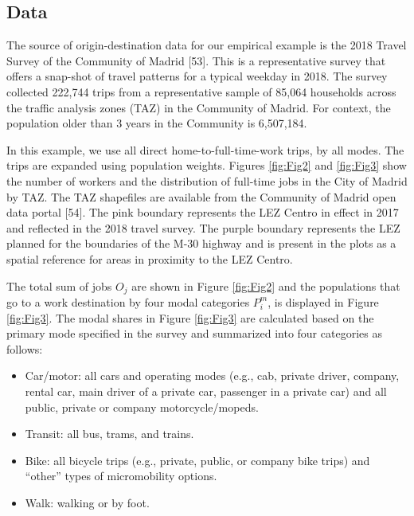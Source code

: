 \documentclass[10pt,letterpaper]{article}
\providecommand{\tightlist}{%
  \setlength{\itemsep}{0pt}\setlength{\parskip}{0pt}}
\begin{document}
\hypertarget{data}{%
\subsection{Data}\label{data}}

The source of origin-destination data for our empirical example is the
2018 Travel Survey of the Community of Madrid {[}53{]}. This is a
representative survey that offers a snap-shot of travel patterns for a
typical weekday in 2018. The survey collected 222,744 trips from a
representative sample of 85,064 households across the traffic analysis
zones (TAZ) in the Community of Madrid. For context, the population
older than 3 years in the Community is 6,507,184.

In this example, we use all direct home-to-full-time-work trips, by all
modes. The trips are expanded using population weights. Figures
\ref{fig:Fig2} and \ref{fig:Fig3} show the number of workers and the
distribution of full-time jobs in the City of Madrid by TAZ. The TAZ
shapefiles are available from the Community of Madrid open data portal
{[}54{]}. The pink boundary represents the LEZ Centro in effect in 2017
and reflected in the 2018 travel survey. The purple boundary represents
the LEZ planned for the boundaries of the M-30 highway and is present in
the plots as a spatial reference for areas in proximity to the LEZ
Centro.

The total sum of jobs \(O_j\) are shown in Figure \ref{fig:Fig2} and the
populations that go to a work destination by four modal categories
\(P^m_i\), is displayed in Figure \ref{fig:Fig3}. The modal shares in
Figure \ref{fig:Fig3} are calculated based on the primary mode specified
in the survey and summarized into four categories as follows:

\begin{itemize}
\tightlist
\item
  Car/motor: all cars and operating modes (e.g., cab, private driver,
  company, rental car, main driver of a private car, passenger in a
  private car) and all public, private or company motorcycle/mopeds.
\item
  Transit: all bus, trams, and trains.
\item
  Bike: all bicycle trips (e.g., private, public, or company bike trips)
  and ``other'' types of micromobility options.
\item
  Walk: walking or by foot.
\end{itemize}
\end{document}
